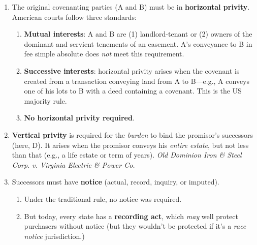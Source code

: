 \begin{enumerate}
\begin{enumerate}
        vague and unpredictable, based upon obscure reasoning, and interfering 
        with the intent of the parties.''\footnote{Casebook p. 874.}
        \item The Restatement (Third) supersedes the touch and concern 
        requirement and assumes that covenants are valid unless it violates 
        public policy. It allows subsequent invalidity based on changed 
        circumstances.\footnote{Casebook pp. 874--75.}
    \end{enumerate}
    \item The original covenanting parties (A and B) must be in 
    \textbf{horizontal privity}. American courts follow three standards:
    \begin{enumerate}
        \item \textbf{Mutual interests}: A and B are (1) landlord-tenant or 
        (2) owners of the dominant and servient tenements of an easement. A's 
        conveyance to B in fee simple absolute does \emph{not} meet this 
        requirement.
        \item \textbf{Successive interests}: horizontal privity arises when 
        the covenant is created from a transaction conveying land from A to 
        B---e.g., A conveys one of his lots to B with a deed containing a 
        covenant. This is the US majority rule.
        \item \textbf{No horizontal privity required}.
    \end{enumerate}
    \item \textbf{Vertical privity} is required for the \emph{burden} to bind 
    the promisor's successors (here, D). It arises when the promisor conveys 
    his \emph{entire estate}, but not less than that (e.g., a life estate or 
    term of years). \emph{Old Dominion Iron \& Steel Corp. v. Virginia 
    Electric \& Power Co.}
    \item Successors must have \textbf{notice} (actual, record, inquiry, or 
    imputed).
    \begin{enumerate}
        \item  Under the traditional rule, no notice was required.
        \item But today, every state has a \textbf{recording act}, which 
        \emph{may} well protect purchasers without notice (but they wouldn't 
        be protected if it's a \emph{race notice} jurisdiction.)
    \end{enumerate}
\end{enumerate}

